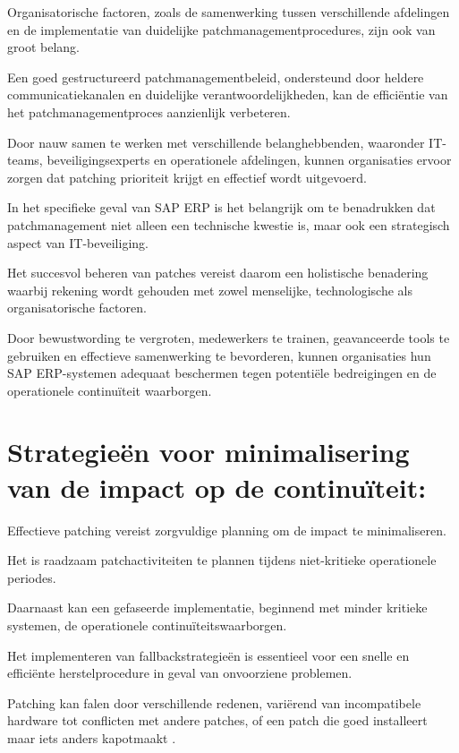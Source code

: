 Organisatorische factoren, zoals de samenwerking tussen verschillende afdelingen en de implementatie van duidelijke patchmanagementprocedures, zijn ook van groot belang.

 Een goed gestructureerd patchmanagementbeleid, ondersteund door heldere communicatiekanalen en duidelijke verantwoordelijkheden, kan de efficiëntie van het patchmanagementproces aanzienlijk verbeteren.

 Door nauw samen te werken met verschillende belanghebbenden, waaronder IT-teams, beveiligingsexperts en operationele afdelingen, kunnen organisaties ervoor zorgen dat patching prioriteit krijgt en effectief wordt uitgevoerd.



In het specifieke geval van SAP ERP is het belangrijk om te benadrukken dat patchmanagement niet alleen een technische kwestie is, maar ook een strategisch aspect van IT-beveiliging.

 Het succesvol beheren van patches vereist daarom een holistische benadering waarbij rekening wordt gehouden met zowel menselijke, technologische als organisatorische factoren.

 Door bewustwording te vergroten, medewerkers te trainen, geavanceerde tools te gebruiken en effectieve samenwerking te bevorderen, kunnen organisaties hun SAP ERP-systemen adequaat beschermen tegen potentiële bedreigingen en de operationele continuïteit waarborgen.

 \autocite{Graffeo2018}

\section{Strategieën voor minimalisering van de impact op de continuïteit:}
Effectieve patching vereist zorgvuldige planning om de impact te minimaliseren.

 Het is raadzaam patchactiviteiten te plannen tijdens niet-kritieke operationele periodes.

 Daarnaast kan een gefaseerde implementatie, beginnend met minder kritieke systemen, de operationele continuïteitswaarborgen.

 Het implementeren van fallbackstrategieën is essentieel voor een snelle en efficiënte herstelprocedure in geval van onvoorziene problemen.

 Patching kan falen door verschillende redenen, variërend van incompatibele hardware tot conflicten met andere patches, of een patch die goed installeert maar iets anders kapotmaakt \autocite{Shein2022}.


